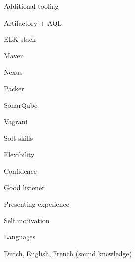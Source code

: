\begin{cvskills}
  \cvskill
    {Additional tooling} %
    {
      \begin{cvitems} %
        \item {Artifactory + AQL} %
        \item {ELK stack} %
        \item {Maven} %
        \item {Nexus} %
        \item {Packer} %
        \item {SonarQube} %
        \item {Vagrant} %
      \end{cvitems}
    }

  \cvskill
    {Soft skills} %
    {
      \begin{cvitems} %
        \item {Flexibility} %
        \item {Confidence} %
        \item {Good listener} %
        \item {Presenting experience} %
        \item {Self motivation} %
      \end{cvitems}
    }

  \cvskill
    {Languages} %
    {
      \begin{cvitems} %
        \item {Dutch, English, French (sound knowledge)} %
      \end{cvitems}
    }

\end{cvskills}

